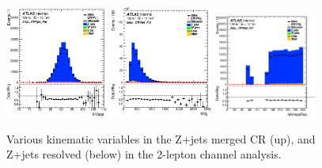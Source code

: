 \begin{figure}[ht]
   \includegraphics[width=0.30\textwidth]{figures/2lep/reweighting/after_reweighting/C_0ptag2pjet_0ptv_CRVjet_Fid_llMass_Lin.eps}
   \includegraphics[width=0.30\textwidth]{figures/2lep/reweighting/after_reweighting/C_0ptag2pjet_0ptv_CRVjet_Fid_Mlljj_Lin.eps}
  \includegraphics[width=0.30\textwidth]{figures/2lep/reweighting/after_reweighting/C_0ptag2pjet_0ptv_CRVjet_Fid_MVHadRes_Lin.eps}
  \caption{ Various kinematic variables in the Z+jets merged CR (up), and Z+jets resolved (below) in the 2-lepton channel analysis.}
   \label{fig:2lep_zjets_resolved_CR}
\end{figure}


